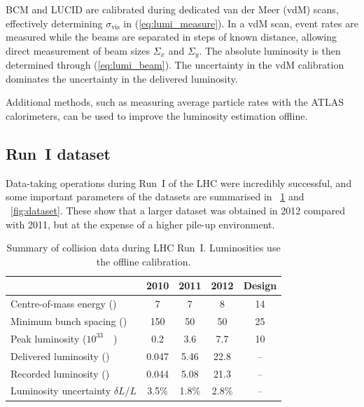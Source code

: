 BCM and LUCID are calibrated during dedicated van der Meer (vdM) scans, effectively 
determining $\sigma_{\text{vis}}$ in (\ref{eq:lumi_measure}). In a vdM scan, event rates 
are measured while the beams are separated in steps of known distance, allowing direct 
measurement of beam sizes $\varSigma_x$ and $\varSigma_y$. The absolute luminosity is 
then determined through (\ref{eq:lumi_beam}). The uncertainty in the vdM calibration 
dominates the uncertainty in the delivered luminosity.

Additional methods, such as measuring average particle rates with the ATLAS calorimeters, 
can be used to improve the luminosity estimation offline.



\subsection{Run~I dataset}
\label{sec:dataset:dataset}

Data-taking operations during Run~I of the LHC were incredibly successful, and some 
important parameters of the \pp datasets are summarised in \Table~\ref{tab:dataset} and 
\Figure~\ref{fig:dataset}. These show that a larger dataset was obtained in 2012 compared 
with 2011, but at the expense of a higher pile-up environment.

\begin{table}[h]
	\begin{tabular}{l@{\hskip 0.3in}c@{\hskip 0.3in}c@{\hskip 0.3in}c@{\hskip 0.3in}c}
		\toprule
		& 2010 & 2011 & 2012 & Design \\
		\midrule
		Centre-of-mass energy (\TeV)         & 7 & 7 & 8 & 14 \\
		Minimum bunch spacing (\nano\second) & 150 & 50 & 50 & 25 \\
		Peak luminosity (\unit{$10^{33}$}{\lumiunits}) & 0.2 & 3.6 & 7.7 & 10 \\
		Delivered luminosity (\invfb)       & 0.047 & 5.46 & 22.8 & -- \\
		Recorded luminosity (\invfb)        & 0.044 & 5.08 & 21.3 & -- \\
		Luminosity uncertainty $\delta L/L$ & 3.5\% & 1.8\% & 2.8\% & -- \\
		\bottomrule
	\end{tabular}
	\caption{Summary of \pp collision data during LHC Run~I. Luminosities use the 
	offline calibration.}
	\label{tab:dataset}
\end{table}

